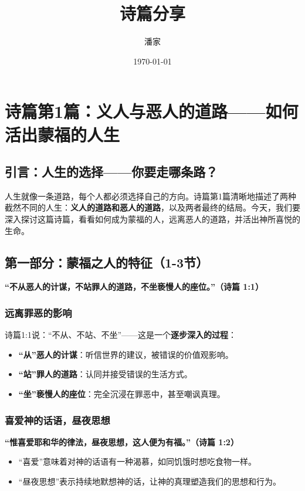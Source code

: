 \documentclass[a4paper, 12pt]{article}
\title{诗篇分享}
\author{潘家}
\date{\today}
\begin{document}
\maketitle


\tableofcontents



\newpage
\section{诗篇第1篇：义人与恶人的道路——如何活出蒙福的人生}
\subsection*{引言：人生的选择——你要走哪条路？}

人生就像一条道路，每个人都必须选择自己的方向。诗篇第1篇清晰地描述了两种截然不同的人生：\textbf{义人的道路和恶人的道路}，以及两者最终的结局。今天，我们要深入探讨这篇诗篇，看看如何成为蒙福的人，远离恶人的道路，并活出神所喜悦的生命。

\subsection*{第一部分：蒙福之人的特征（1-3节）}

\textbf{“不从恶人的计谋，不站罪人的道路，不坐亵慢人的座位。”（诗篇 1:1）}

\subsubsection*{远离罪恶的影响}
诗篇1:1说：“不从、不站、不坐”——这是一个\textbf{逐步深入的过程}：
\begin{itemize}
    \item \textbf{“从”恶人的计谋}：听信世界的建议，被错误的价值观影响。
    \item \textbf{“站”罪人的道路}：认同并接受错误的生活方式。
    \item \textbf{“坐”亵慢人的座位}：完全沉浸在罪恶中，甚至嘲讽真理。
\end{itemize}

\subsubsection*{喜爱神的话语，昼夜思想}
\textbf{“惟喜爱耶和华的律法，昼夜思想，这人便为有福。”（诗篇 1:2）}

\begin{itemize}
    \item “喜爱”意味着对神的话语有一种渴慕，如同饥饿时想吃食物一样。
    \item “昼夜思想”表示持续地默想神的话，让神的真理塑造我们的思想和行为。
\end{itemize}
\end{document}
